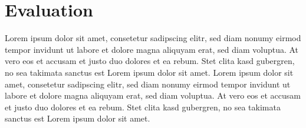 \documentclass[a4paper,12pt]{scrartcl}
\begin{document}






\section{Evaluation}

Lorem ipsum dolor sit amet, consetetur sadipscing elitr, sed diam nonumy eirmod tempor invidunt ut labore et dolore magna aliquyam erat, sed diam voluptua. At vero eos et accusam et justo duo dolores et ea rebum. Stet clita kasd gubergren, no sea takimata sanctus est Lorem ipsum dolor sit amet. Lorem ipsum dolor sit amet, consetetur sadipscing elitr, sed diam nonumy eirmod tempor invidunt ut labore et dolore magna aliquyam erat, sed diam voluptua. At vero eos et accusam et justo duo dolores et ea rebum. Stet clita kasd gubergren, no sea takimata sanctus est Lorem ipsum dolor sit amet.
\end{document}
